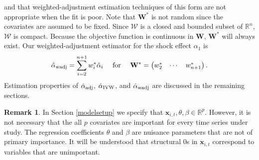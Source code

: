 \documentclass[11pt]{article}
\def\mbf#1{\mathbf{#1}} %
\newcommand{\reals}{\mathbb{R}} %
\def\mc#1{\mathcal{#1}} %
\theoremstyle{definition}
\newtheorem{remark}{Remark}
\begin{document}
and that weighted-adjustment estimation techniques of this form are not 
appropriate when the fit is poor. 
Note that $\mbf{W}^*$ is not random since the covariates are assumed to be fixed. Since $\mc{W}$ is a closed and bounded subset of $\reals^n$,  $\mc{W}$ is compact. Because the objective function 
is continuous in $\mbf{W}$, $\mbf{W}^*$ will always exist. %
Our weighted-adjustment estimator for the shock effect $\alpha_1$ is
  \begin{align*}
    \hat{\alpha}_{\rm wadj} = \sum_{i=2}^{n+1} w_i^*\hat{\alpha}_i
    \quad \text{ for } \quad \mbf{W}^* = \begin{pmatrix}
      w^*_2 & \cdots & w^*_{n+1}
    \end{pmatrix}.
  \end{align*}
Estimation properties of $\hat{\alpha}_{\rm adj}$, $\hat{\alpha}_{\rm IVW}$, 
and $\hat{\alpha}_{\rm wadj}$ are discussed in the remaining sections.


\begin{remark}
In Section \ref{modelsetup} we specify that $\mbf{x}_{i,t}, \theta, \beta \in \reals^p$. 
However, it is not necessary that the all $p$ covariates are important for every time series under study. The regression coefficients $\theta$ and $\beta$ are nuisance parameters that are not of primary importance. 
It will be understood that structural 0s in $\mbf{x}_{i,t}$ correspond to variables that are unimportant. 
\end{remark}
\end{document}

